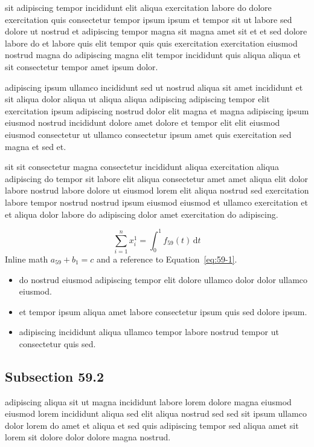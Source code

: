 \documentclass{article}
\begin{document}
sit adipiscing tempor incididunt elit aliqua exercitation labore do dolore exercitation quis consectetur tempor ipsum ipsum et tempor sit ut labore sed dolore ut nostrud et adipiscing tempor magna sit magna amet sit et et sed dolore labore do et labore quis elit tempor quis quis exercitation exercitation eiusmod nostrud magna do adipiscing magna elit tempor incididunt quis aliqua aliqua et sit consectetur tempor amet ipsum dolor.

adipiscing ipsum ullamco incididunt sed ut nostrud aliqua sit amet incididunt et sit aliqua dolor aliqua ut aliqua aliqua adipiscing adipiscing tempor elit exercitation ipsum adipiscing nostrud dolor elit magna et magna adipiscing ipsum eiusmod nostrud incididunt dolore amet dolore et tempor elit elit eiusmod eiusmod consectetur ut ullamco consectetur ipsum amet quis exercitation sed magna et sed et.

sit sit consectetur magna consectetur incididunt aliqua exercitation aliqua adipiscing do tempor sit labore elit aliqua consectetur amet amet aliqua elit dolor labore nostrud labore dolore ut eiusmod lorem elit aliqua nostrud sed exercitation labore tempor nostrud nostrud ipsum eiusmod eiusmod et ullamco exercitation et et aliqua dolor labore do adipiscing dolor amet exercitation do adipiscing.

\begin{equation}\label{eq:59-1}
  \sum_{i=1}^{n} x_i^{1} = \int_0^1 f_{59}(t)\,\mathrm{d}t
\end{equation}
Inline math $a_{59} + b_{1} = c$ and a reference to Equation~\eqref{eq:59-1}.

\begin{itemize}
  \item do nostrud eiusmod adipiscing tempor elit dolore ullamco dolor dolor ullamco eiusmod.
  \item et tempor ipsum aliqua amet labore consectetur ipsum quis sed dolore ipsum.
  \item adipiscing incididunt aliqua ullamco tempor labore nostrud tempor ut consectetur quis sed.
\end{itemize}

\subsection{Subsection 59.2}\label{sec:59-2}
adipiscing aliqua sit ut magna incididunt labore lorem dolore magna eiusmod eiusmod lorem incididunt aliqua sed elit aliqua nostrud sed sed sit ipsum ullamco dolor lorem do amet et aliqua et sed quis adipiscing tempor sed aliqua amet sit lorem sit dolore dolor dolore magna nostrud.
\end{document}
